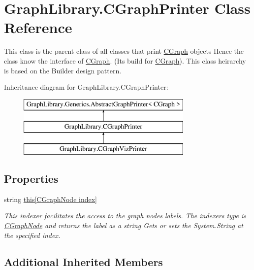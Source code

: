 \hypertarget{class_graph_library_1_1_c_graph_printer}{}\section{Graph\+Library.\+C\+Graph\+Printer Class Reference}
\label{class_graph_library_1_1_c_graph_printer}


This class is the parent class of all classes that print \hyperlink{class_graph_library_1_1_c_graph}{C\+Graph} objects Hence the class know the interface of \hyperlink{class_graph_library_1_1_c_graph}{C\+Graph}. (Its build for \hyperlink{class_graph_library_1_1_c_graph}{C\+Graph}). This class heirarchy is based on the Builder design pattern.  


Inheritance diagram for Graph\+Library.\+C\+Graph\+Printer\+:\begin{figure}[H]
\begin{center}
\leavevmode
\includegraphics[height=3.000000cm]{class_graph_library_1_1_c_graph_printer}
\end{center}
\end{figure}
\subsection*{Properties}
\begin{DoxyCompactItemize}
\item 
string \hyperlink{class_graph_library_1_1_c_graph_printer_a51fce717e0bd2b68bf8d96f9c6a98b3c}{this\mbox{[}\+C\+Graph\+Node index\mbox{]}}
\begin{DoxyCompactList}\small\item\em This indexer facilitates the access to the graph nodes labels. The indexer\textquotesingle{}s type is \hyperlink{class_graph_library_1_1_c_graph_node}{C\+Graph\+Node} and returns the label as a string Gets or sets the System.\+String at the specified index. \end{DoxyCompactList}\end{DoxyCompactItemize}
\subsection*{Additional Inherited Members}


